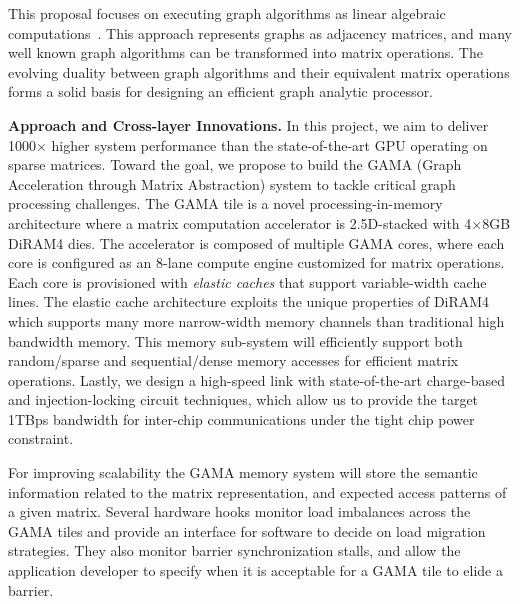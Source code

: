 \noindent
This proposal focuses on executing graph algorithms as linear algebraic computations~\cite{graph:primitives}. 
This approach represents graphs as adjacency matrices, and many well known graph algorithms can be transformed into matrix operations. 
The evolving 
duality between graph algorithms and their equivalent matrix operations forms a solid basis 
for designing an efficient graph analytic processor. 

\vspace{3pt}
\noindent
\textbf{Approach and Cross-layer Innovations.} 
In this project, we aim to deliver 1000$\times$ higher system performance than the state-of-the-art GPU operating on sparse matrices.
Toward the goal, we propose to build the GAMA (Graph Acceleration through Matrix Abstraction) system to tackle critical graph processing challenges. 
The GAMA tile is a novel processing-in-memory architecture where a matrix computation accelerator is 2.5D-stacked with 4$\times$8GB DiRAM4 dies.
The accelerator is composed of multiple GAMA cores, where each core is configured as an 8-lane %
compute engine customized for matrix operations. 
Each core is provisioned with \textit{elastic caches} 
that support variable-width cache lines.  
The elastic cache architecture exploits the unique properties of DiRAM4 which supports many more narrow-width memory channels than traditional high bandwidth memory.
This memory sub-system will efficiently support both random/sparse and sequential/dense memory accesses for efficient matrix operations. 
Lastly, we design a high-speed link with state-of-the-art charge-based and injection-locking circuit techniques, which allow us to provide the target 1TBps bandwidth for inter-chip communications under the tight chip power constraint.

For improving scalability the GAMA memory system will store the semantic information related to the matrix representation, and expected access patterns of a given matrix. 
Several hardware hooks monitor load imbalances across the GAMA tiles and provide an interface for software to decide on load migration strategies. 
They also monitor barrier synchronization stalls, and allow the application developer to specify when it is acceptable for a GAMA tile to elide a barrier. 

